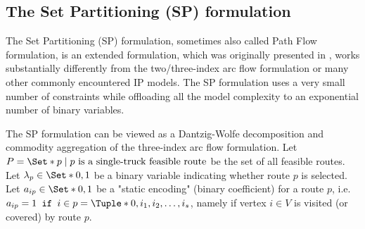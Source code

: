 \begin{comment}
There's an important observation to be made on constraint \eqref{eq:three-index-flow-tour-starts-and-ends-at-depot}.
By using the equality sign, we're forcing solutions to use all the available $K$ trucks, even though better solutions making use of less trucks may exist.
In our case, we decided to fix the number of routes in the CVRP formulation since it seems that this is the most agreed contention in the literature.
Some authors, instead, prefer a different CVRP formulation, by not fixing the number of routes, and by essentially using a less-than-sign in place of the equality.

The three-index flow formulation is usually solved through the usage of a standard Branch \& Cut framework approach.
Modern CVRP solvers, instead, rely on a different mathematical formulation and employ a  mostly Branch \& Price based-approach (although hybridization are also possible).
The Set Partitioning (SP) formulation is the main starting point employed by Branch \& Price solvers.
In this thesis we will mostly concentrate on Branch \& Price approaches for the CVRP.
In the next subsection we will introduce the set partitioning formulation, and in the remainder of the section
we will briefly introduce the key ingredients of modern Branch \& Price solvers.

\end{comment}

\subsection{The Set Partitioning (SP) formulation}
\label{sec:intro-set-partition-formulation}

The Set Partitioning (SP) formulation, sometimes also called Path Flow formulation, is an extended formulation, which was originally presented in \textcite{balinski1964},
works substantially differently from the two/three-index arc flow formulation or many other commonly encountered IP models.
The SP formulation uses a very small number of constraints while offloading all the model complexity to an exponential number of binary variables.


The SP formulation can be viewed as a Dantzig-Wolfe decomposition \parencite{dantzig1960}
and commodity aggregation \parencite{desaulniers1998}
of the three-index arc flow formulation.
Let $P = \Set*{p \mid p\ \text{is a single-truck feasible route}}$ be the set of all feasible routes.
Let $\lambda_p \in \Set*{0, 1}$ be a binary variable indicating whether route $p$ is selected.
Let $a_{ip} \in \Set*{0, 1}$ be a "static encoding" (binary coefficient) for a route $p$,
i.e. $a_{ip} = 1 \texttt{ if } i \in p = \Tuple*{0, i_1, i_2, \dots, i_s}$,
namely if vertex $i \in V$ is visited (or covered) by route $p$.

